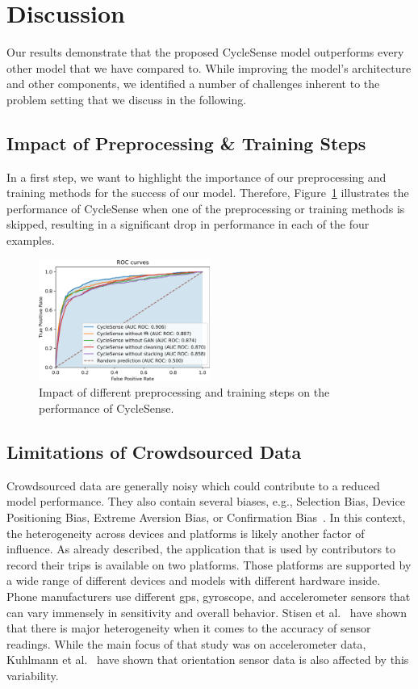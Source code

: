 \section{Discussion}
\label{sec:discussion_cyclesense}
Our results demonstrate that the proposed CycleSense model outperforms every other model that we have compared to.
While improving the model's architecture and other components, we identified a number of challenges inherent to the problem setting that we discuss in the following.


\subsection{Impact of Preprocessing \& Training Steps}
\label{subsec:impact_of_preprocessing_and_training_steps}
In a first step, we want to highlight the importance of our preprocessing and training methods for the success of our model.
Therefore, Figure~\ref{fig:impact} illustrates the performance of CycleSense when one of the preprocessing or training methods is skipped, resulting in a significant drop in performance in each of the four examples.

\begin{figure}[t]
	\centering
	\includegraphics[width=0.5\textwidth]{fig/impact.png}
	\caption{Impact of different preprocessing and training steps on the performance of CycleSense.}
	\label{fig:impact}
\end{figure}

\subsection{Limitations of Crowdsourced Data}
\label{subsec:limitations_of_crowdsourced_data}
Crowdsourced data are generally noisy which could contribute to a reduced model performance.
They also contain several biases, e.g., Selection Bias, Device Positioning Bias, Extreme Aversion Bias, or Confirmation Bias~\cite{basiri2019crowdsourced, chakraborty2017makes, kahneman1991anomalies}.
In this context, the heterogeneity across devices and platforms is likely another factor of influence.
As already described, the application that is used by contributors to record their trips is available on two platforms. 
Those platforms are supported by a wide range of different devices and models with different hardware inside. 
Phone manufacturers use different \ac{gps}, gyroscope, and accelerometer sensors that can vary immensely in sensitivity and overall behavior.
Stisen et al.~\cite{stisen2015smart} have shown that there is major heterogeneity when it comes to the accuracy of sensor readings. 
While the main focus of that study was on accelerometer data, Kuhlmann et al.~\cite{kuhlmann2021smartphone} have shown that orientation sensor data is also affected by this variability.

